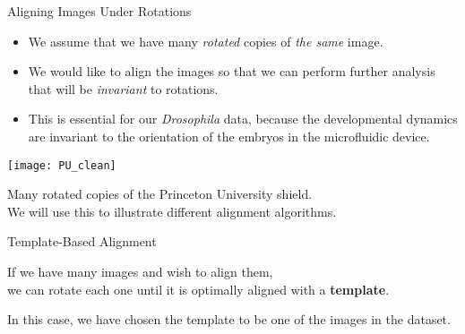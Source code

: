 \begin{frame}[t]{Aligning Images Under Rotations}
	
	\begin{itemize}
	\item We assume that we have many {\em rotated} copies of {\em the same} image.
	\item We would like to align the images so that we can perform further analysis that will be {\em invariant} to rotations. 
	\item This is essential for our {\em Drosophila} data, because the developmental dynamics are invariant to the orientation of the embryos in the microfluidic device.
	\end{itemize}

	\centering
	\texttt{[image: PU\_clean]}\\
	{\scriptsize Many rotated copies of the Princeton University shield. \\ We will use this to illustrate different alignment algorithms. \par}	

\end{frame}

\begin{frame}[t]{Template-Based Alignment}
	\centering	
	
	If we have many images and wish to align them, \\ we can rotate each one until it is optimally aligned with a {\bf template}.

	In this case, we have chosen the template to be one of the images in the dataset.

		
\end{frame}

